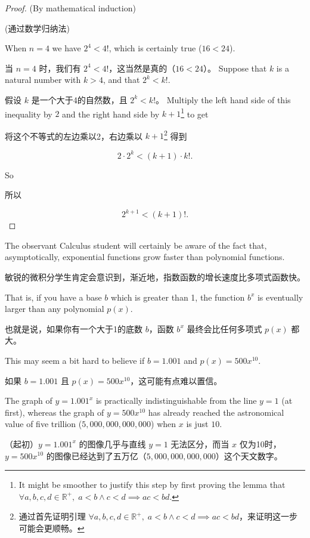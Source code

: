 \begin{proof} (By mathematical induction)

(通过数学归纳法)

 When $n=4$ we have $2^4 < 4!$, which is certainly 
true ($16 < 24$).

当 $n=4$ 时，我们有 $2^4 < 4!$，这当然是真的（$16 < 24$）。
 Suppose that $k$ is a natural number 
with $k > 4$, and that $2^k < k!$.

假设 $k$ 是一个大于4的自然数，且 $2^k < k!$。
Multiply the left hand side of this
inequality by $2$ and the right hand side by $k+1$\footnote{It might be %
smoother to justify this step by first proving the lemma that %
$\forall a,b,c,d \in {\mathbb R}^+, \; a<b \land c<d \implies ac < bd$.} 
to get

将这个不等式的左边乘以2，右边乘以 $k+1$\footnote{通过首先证明引理 $\forall a,b,c,d \in {\mathbb R}^+, \; a<b \land c<d \implies ac < bd$，来证明这一步可能会更顺畅。} 得到

\[ 2\cdot 2^{k} < (k+1) \cdot k!.
\]

\noindent So

\noindent 所以

\[ 2^{k+1} < (k+1)!. \]

\end{proof}

The observant Calculus student will certainly be aware of the fact
that, asymptotically, exponential functions grow faster than polynomial
functions.

敏锐的微积分学生肯定会意识到，渐近地，指数函数的增长速度比多项式函数快。

That is, if you have a base $b$ which is greater than 1, the 
function $b^x$ is eventually larger than any polynomial $p(x)$.

也就是说，如果你有一个大于1的底数 $b$，函数 $b^x$ 最终会比任何多项式 $p(x)$ 都大。

This
may seem a bit hard to believe if $b=1.001$ and $p(x) = 500x^{10}$.

如果 $b=1.001$ 且 $p(x) = 500x^{10}$，这可能有点难以置信。

The
graph of $y=1.001^x$ is practically indistinguishable from the line $y=1$
(at first), whereas the graph of $y=500x^{10}$ has already reached the 
astronomical value of five trillion ($5,000,000,000,000$) when $x$ is just
$10$.

（起初）$y=1.001^x$ 的图像几乎与直线 $y=1$ 无法区分，而当 $x$ 仅为10时，$y=500x^{10}$ 的图像已经达到了五万亿（$5,000,000,000,000$）这个天文数字。

